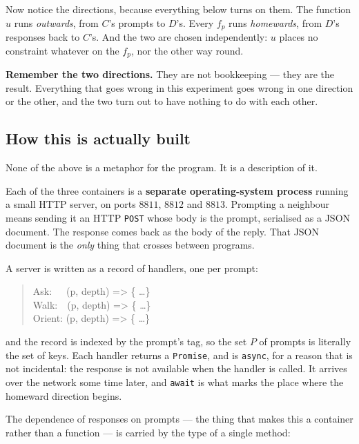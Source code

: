 \documentclass[11pt,a4paper]{article}
\begin{document}
Now notice the directions, because everything below turns on them. The function
$u$ runs \emph{outwards}, from $C$'s prompts to $D$'s. Every $f_p$ runs
\emph{homewards}, from $D$'s responses back to $C$'s. And the two are chosen
independently: $u$ places no constraint whatever on the $f_p$, nor the other
way round.

\begin{keybox}
\textbf{Remember the two directions.} They are not bookkeeping --- they are the
result. Everything that goes wrong in this experiment goes wrong in one
direction or the other, and the two turn out to have nothing to do with each
other.
\end{keybox}

\subsection*{How this is actually built}

None of the above is a metaphor for the program. It is a description of it.

Each of the three containers is a \textbf{separate operating-system process}
running a small HTTP server, on ports $8811$, $8812$ and $8813$. Prompting a
neighbour means sending it an HTTP \texttt{POST} whose body is the prompt,
serialised as a JSON document. The response comes back as the body of the
reply. That JSON document is the \emph{only} thing that crosses between
programs.

A server is written as a record of handlers, one per prompt:

\begin{quote}\ttfamily\small
Ask:\ \ \ (p, depth) => \{ \ldots \}\\
Walk:\ \ (p, depth) => \{ \ldots \}\\
Orient: (p, depth) => \{ \ldots \}
\end{quote}

\noindent
and the record is indexed by the prompt's tag, so the set $P$ of prompts is literally the set of keys. Each handler returns a
\texttt{Promise}, and is \texttt{async}, for a reason that is not incidental:
the response is not available when the handler is called. It arrives over the
network some time later, and \texttt{await} is what marks the place where the
homeward direction begins.

The dependence of responses on prompts --- the thing that makes this a
container rather than a function --- is carried by the type of a single method:
\end{document}
